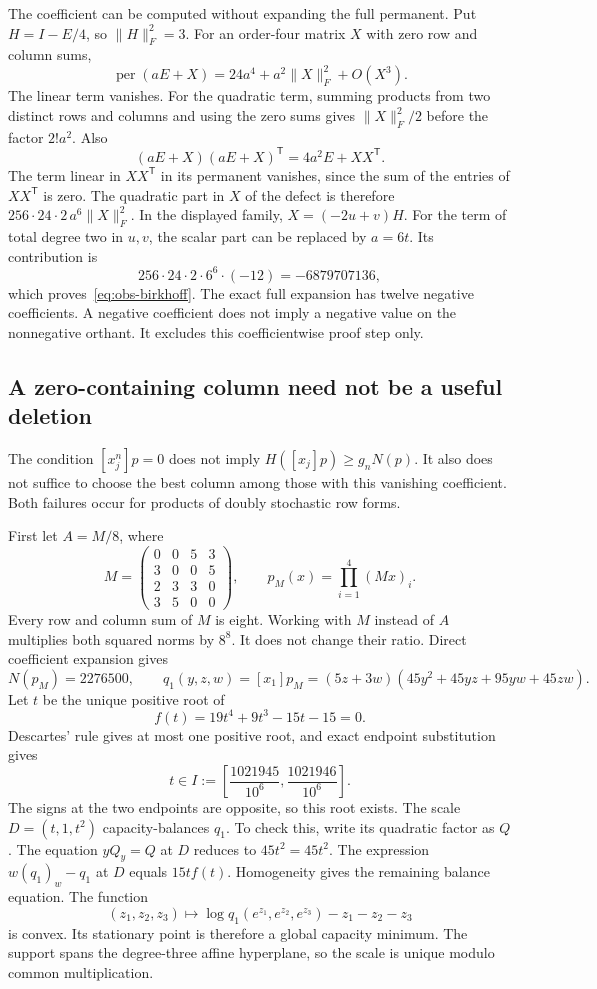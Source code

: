\documentclass[11pt,a4paper]{article}
\theoremstyle{definition}
\theoremstyle{remark}
\newcommand{\per}{\operatorname{per}}
\newcommand{\T}{\mathsf{T}}
\begin{document}
The coefficient can be computed without expanding the full permanent.
Put $H=I-E/4$, so $\|H\|_F^2=3$.
For an order-four matrix $X$ with zero row and column sums,
\[
 \per(aE+X)=24a^4+a^2\|X\|_F^2+O(X^3).
\]
The linear term vanishes.
For the quadratic term, summing products from two distinct rows and columns
and using the zero sums gives $\|X\|_F^2/2$ before the factor $2!a^2$.
Also
\[
 (aE+X)(aE+X)^\T=4a^2E+XX^\T.
\]
The term linear in $XX^\T$ in its permanent vanishes, since the sum of the
entries of $XX^\T$ is zero.
The quadratic part in $X$ of the defect is therefore
$256\cdot24\cdot2\,a^6\|X\|_F^2$.
In the displayed family, $X=(-2u+v)H$.
For the term of total degree two in $u,v$, the scalar part can be replaced
by $a=6t$.
Its contribution is
\[
 256\cdot24\cdot2\cdot6^6\cdot(-12)=-6879707136,
\]
which proves~\eqref{eq:obs-birkhoff}.
The exact full expansion has twelve negative coefficients.
A negative coefficient does not imply a negative value on the nonnegative
orthant. It excludes this coefficientwise proof step only.

\subsection{A zero-containing column need not be a useful deletion}

The condition $[x_j^n]p=0$ does not imply $H([x_j]p)\ge g_nN(p)$.
It also does not suffice to choose the best column among those with this
vanishing coefficient.
Both failures occur for products of doubly stochastic row forms.

First let $A=M/8$, where
\[
 M=\begin{pmatrix}
 0&0&5&3\\3&0&0&5\\2&3&3&0\\3&5&0&0
 \end{pmatrix},\qquad p_M(x)=\prod_{i=1}^4(Mx)_i.
\]
Every row and column sum of $M$ is eight.
Working with $M$ instead of $A$ multiplies both squared norms by $8^8$.
It does not change their ratio.
Direct coefficient expansion gives
\[
 N(p_M)=2276500,\qquad
 q_1(y,z,w)=[x_1]p_M=(5z+3w)(45y^2+45yz+95yw+45zw).
\]
Let $t$ be the unique positive root of
\[
 f(t)=19t^4+9t^3-15t-15=0.
\]
Descartes' rule gives at most one positive root, and exact endpoint
substitution gives
\[
 t\in I:=\left[\frac{1021945}{10^6},\frac{1021946}{10^6}\right].
\]
The signs at the two endpoints are opposite, so this root exists.
The scale $D=(t,1,t^2)$ capacity-balances $q_1$.
To check this, write its quadratic factor as $Q$.
The equation $yQ_y=Q$ at $D$ reduces to $45t^2=45t^2$.
The expression $w(q_1)_w-q_1$ at $D$ equals $15t f(t)$.
Homogeneity gives the remaining balance equation.
The function
\[
 (z_1,z_2,z_3)\longmapsto
 \log q_1(e^{z_1},e^{z_2},e^{z_3})-z_1-z_2-z_3
\]
is convex. Its stationary point is therefore a global capacity minimum.
The support spans the degree-three affine hyperplane, so the scale is
unique modulo common multiplication.
\end{document}
